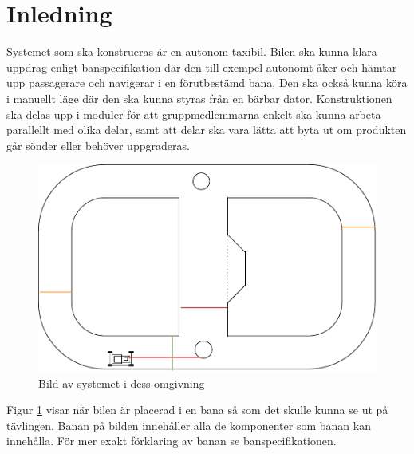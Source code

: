 \documentclass[systemskiss/skiss.tex]{subfiles}
\begin{document}
\section{Inledning}
Systemet som ska konstrueras är en autonom taxibil. Bilen ska kunna klara
uppdrag enligt banspecifikation där den till exempel autonomt åker och hämtar
upp passagerare och navigerar i en förutbestämd bana. Den ska också kunna köra i manuellt läge där den ska kunna
styras från en bärbar dator. Konstruktionen ska delas upp i moduler för att gruppmedlemmarna enkelt ska kunna arbeta parallellt med olika delar, samt att delar ska vara lätta att byta ut om produkten går sönder eller behöver uppgraderas.

\begin{figure}[h]
    \centering
    \includegraphics[width=0.6\linewidth]{systemskiss/figures/systemomgivning.pdf}
    \caption{Bild av systemet i dess omgivning}
    \label{fig:omgivning}
\end{figure}

Figur \ref{fig:omgivning} visar när bilen är placerad i en bana så som det
skulle kunna se ut på tävlingen. Banan på bilden innehåller alla de komponenter
som banan kan innehålla. För mer exakt förklaring av banan se banspecifikationen.
\end{document}
